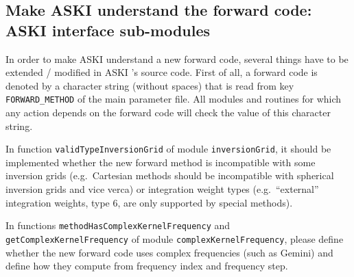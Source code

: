 \documentclass[12pt,a4paper]{article}
\newcommand{\lcode}[1]{\nolinkurl{#1}}
\newcommand{\ASKI}{ {\ttfamily ASKI} }
\begin{document}
\subsection{Make \ASKI{} understand the forward code: \ASKI{} interface sub-modules} \label{ssec-extend:ASKI_interface}
In order to make \ASKI{} understand a new forward code, several things have to be extended / modified in \ASKI{}'s 
source code. First of all, a forward code is denoted by a character string (without spaces) that is read from 
key \lcode{FORWARD_METHOD} of the main parameter file. All modules and routines for which any action depends on the
forward code will check the value of this character string. 

In function \lcode{validTypeInversionGrid} of module \lcode{inversionGrid}, it should be implemented whether
the new forward method is incompatible with some inversion grids (e.g.\ Cartesian methods should be incompatible
with spherical inversion grids and vice verca) or integration weight types (e.g.\ ``external'' integration weights,
type 6, are only supported by special methods).

In functions \lcode{methodHasComplexKernelFrequency} and \lcode{getComplexKernelFrequency} of module 
\lcode{complexKernelFrequency}, please define whether the new forward code uses complex frequencies
(such as Gemini) and define how they compute from frequency index and frequency step. 
\end{document}

